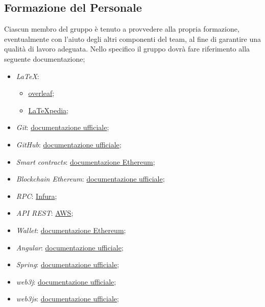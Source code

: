     \subsection{Formazione del Personale}
        Ciascun membro del gruppo è tenuto a provvedere alla propria formazione, eventualmente con l'aiuto degli altri componenti del team, al fine di garantire una qualità di lavoro adeguata.
        Nello specifico il gruppo dovrà fare riferimento alla seguente documentazione;
                \begin{itemize}
                    \item \textit{LaTeX}:
                        \begin{itemize}
                            \item  \href{https://www.overleaf.com/learn}{overleaf};
                            \item \href{http://www.lorenzopantieri.net/LaTeX_files/LaTeXpedia.pdf}{LaTeXpedia};
                        \end{itemize}
                    \item \textit{Git}: \href{https://git-scm.com/docs}{documentazione ufficiale};
                    \item \textit{GitHub}: \href{https://support.github.com}{documentazione ufficiale};
                    \item \textit{Smart contracts}: \href{https://ethereum.org/it/developers/docs/smart-contracts/}{documentazione Ethereum};
                    \item \textit{Blockchain Ethereum}: \href{https://ethereum.org/it/developers/docs/smart-contracts/}{documentazione ufficiale};
                    \item \textit{RPC}: \href{https://blog.infura.io/post/ethereum-rpcs-methods}{Infura};
                    \item \textit{API REST}: \href{https://aws.amazon.com/it/what-is/restful-api/}{AWS};
                    \item \textit{Wallet}: \href{https://ethereum.org/en/wallets/}{documentazione Ethereum};
                    \item \textit{Angular}: \href{https://angular.io/docs}{documentazione ufficiale};
                    \item \textit{Spring}: \href{https://spring.io/why-spring}{documentazione ufficiale};
                    \item \textit{web3j}: \href{https://docs.web3j.io/}{documentazione ufficiale};
                    \item \textit{web3js}: \href{https://web3js.readthedocs.io/}{documentazione ufficiale};
                \end{itemize}